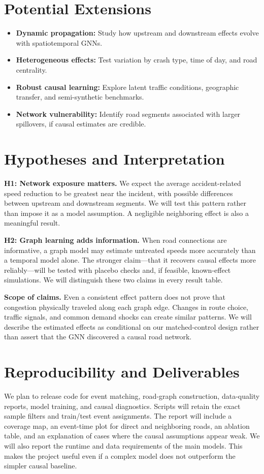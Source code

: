 \documentclass[sigconf,nonacm]{acmart}
\begin{document}
\section{Potential Extensions}
\begin{itemize}
    \item \textbf{Dynamic propagation:} Study how upstream and
    downstream effects evolve with spatiotemporal GNNs.
    \item \textbf{Heterogeneous effects:} Test variation by crash type,
    time of day, and road centrality.
    \item \textbf{Robust causal learning:} Explore latent traffic
    conditions, geographic transfer, and semi-synthetic benchmarks.
    \item \textbf{Network vulnerability:} Identify road segments
    associated with larger spillovers, if causal estimates are credible.
\end{itemize}

\section{Hypotheses and Interpretation}
\textbf{H1: Network exposure matters.} We expect the average
accident-related speed reduction to be greatest near the incident,
with possible differences between upstream and downstream segments.
We will test this pattern rather than impose it as a model assumption.
A negligible neighboring effect is also a meaningful result.

\textbf{H2: Graph learning adds information.} When road connections
are informative, a graph model may estimate untreated speeds more
accurately than a temporal model alone. The stronger claim---that it
recovers causal effects more reliably---will be tested with placebo
checks and, if feasible, known-effect simulations. We will distinguish
these two claims in every result table.

\textbf{Scope of claims.} Even a consistent effect pattern does not
prove that congestion physically traveled along each graph edge.
Changes in route choice, traffic signals, and common demand shocks
can create similar patterns. We will describe the estimated effects
as conditional on our matched-control design rather than assert
that the GNN discovered a causal road network.

\section{Reproducibility and Deliverables}
We plan to release code for event matching, road-graph construction,
data-quality reports, model training, and causal diagnostics. Scripts
will retain the exact sample filters and train/test event assignments.
The report will include a coverage map, an event-time plot for direct
and neighboring roads, an ablation table, and an explanation of cases
where the causal assumptions appear weak. We will also report the
runtime and data requirements of the main models. This makes the
project useful even if a complex model does not outperform the
simpler causal baseline.
\end{document}
